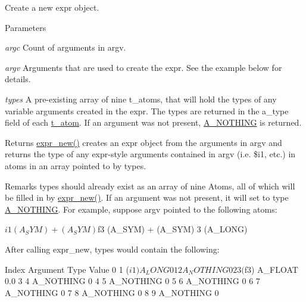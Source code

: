 Create a new expr object. 
\begin{DoxyParams}{Parameters}
\item[{\em argc}]Count of arguments in argv. \item[{\em argv}]Arguments that are used to create the expr. See the example below for details. \item[{\em types}]A pre-\/existing array of nine t\_\-atoms, that will hold the types of any variable arguments created in the expr. The types are returned in the a\_\-type field of each \hyperlink{structt__atom}{t\_\-atom}. If an argument was not present, \hyperlink{group__atom_gga8aa6700e9f00b132eb376db6e39ade47a858ddb5d5927eae3fd699a82c7e174b6}{A\_\-NOTHING} is returned. \end{DoxyParams}
\begin{DoxyReturn}{Returns}
\hyperlink{group__expr_ga7430f6be4bb5d54c7ded0a9ba6b8961f}{expr\_\-new()} creates an expr object from the arguments in argv and returns the type of any expr-\/style arguments contained in argv (i.e. \$i1, etc.) in atoms in an array pointed to by types.
\end{DoxyReturn}
\begin{DoxyRemark}{Remarks}
types should already exist as an array of nine Atoms, all of which will be filled in by \hyperlink{group__expr_ga7430f6be4bb5d54c7ded0a9ba6b8961f}{expr\_\-new()}. If an argument was not present, it will set to type \hyperlink{group__atom_gga8aa6700e9f00b132eb376db6e39ade47a858ddb5d5927eae3fd699a82c7e174b6}{A\_\-NOTHING}. For example, suppose argv pointed to the following atoms: 
\begin{DoxyCode}
    $i1 (A_SYM) 
    + (A_SYM) 
    $f3 (A_SYM) 
    + (A_SYM) 
    3 (A_LONG) 
\end{DoxyCode}

\end{DoxyRemark}
After calling expr\_\-new, types would contain the following: 
\begin{DoxyCode}
    Index   Argument    Type        Value 
    0   1 ($i1)     A_LONG      0 
    1   2       A_NOTHING   0 
    2   3 ($f3)     A_FLOAT     0.0 
    3   4       A_NOTHING   0 
    4   5       A_NOTHING   0 
    5   6       A_NOTHING   0 
    6   7       A_NOTHING   0 
    7   8       A_NOTHING   0 
    8   9       A_NOTHING   0
\end{DoxyCode}
 